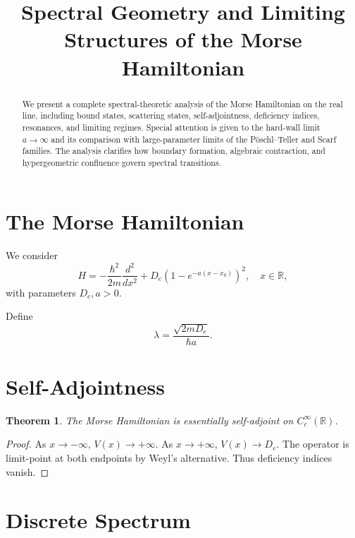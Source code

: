 \documentclass[12pt]{article}
\title{\textbf{Spectral Geometry and Limiting Structures of the Morse Hamiltonian}}
\author{ }
\date{}
\newtheorem{theorem}{Theorem}[section]
\begin{document}
\maketitle

\begin{abstract}
We present a complete spectral-theoretic analysis of the Morse Hamiltonian on the real line, including bound states, scattering states, self-adjointness, deficiency indices, resonances, and limiting regimes.
Special attention is given to the hard-wall limit $a\to\infty$ and its comparison with large-parameter limits of the P\"oschl--Teller and Scarf families.
The analysis clarifies how boundary formation, algebraic contraction, and hypergeometric confluence govern spectral transitions.
\end{abstract}

\tableofcontents

\section{The Morse Hamiltonian}

We consider
\[
H = -\frac{\hbar^2}{2m}\frac{d^2}{dx^2}
+ D_e(1-e^{-a(x-x_0)})^2,
\quad x\in\mathbb R,
\]
with parameters $D_e,a>0$.

Define
\[
\lambda=\frac{\sqrt{2mD_e}}{\hbar a}.
\]

\section{Self-Adjointness}

\begin{theorem}
The Morse Hamiltonian is essentially self-adjoint on $C_c^\infty(\mathbb R)$.
\end{theorem}

\begin{proof}
As $x\to -\infty$, $V(x)\to +\infty$.
As $x\to +\infty$, $V(x)\to D_e$.
The operator is limit-point at both endpoints by Weyl’s alternative.
Thus deficiency indices vanish.
\end{proof}

\section{Discrete Spectrum}
\end{document}

